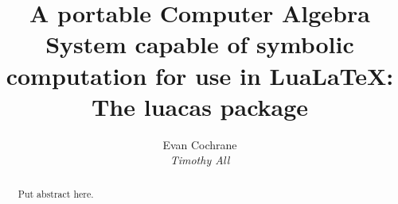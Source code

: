 \documentclass{article}
\begin{document}
\title{A portable Computer Algebra System capable of symbolic computation for use in Lua\LaTeX{}: \\  The {\ttfamily luacas} package }
\author{Evan Cochrane \\ {\itshape Timothy All}}
\date{} 

\maketitle 

\begin{abstract}
    Put abstract here. 
\end{abstract}

\tableofcontents

















 

 













\appendix



\newpage

\printindex
\end{document}
